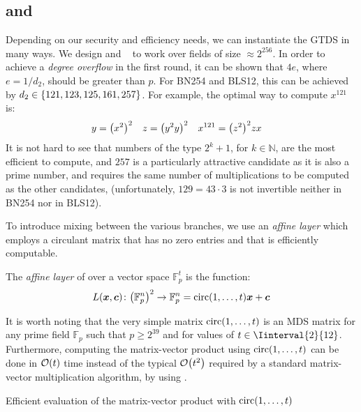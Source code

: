 \subsection{\Arion{} and \Arionhash{}}
Depending on our security and efficiency needs, we can instantiate the GTDS in many 
ways.
We design \Arion{} and \Arionhash{}~\textbf{\cite{RoyST2023}} to work over fields of size 
\(\approx 2^{256}\).
In order to achieve a \emph{degree overflow} in the first round, it can be shown that \(4e\), where 
\(e = {1}/{d_2}\), should be greater than \(p\). 
For BN254 and BLS12, this can be achieved by \(d_2 \in \left\{121, 123, 125, 161, 257\right\}\).
For example, the optimal way to compute \(x^{121}\) is:
\begin{align*}
  & y = \Parens*{x^{2}}^{2} && z = \Parens*{y^{2}y}^{2} && x^{121} = \Parens*{z^{2}}^{2}zx
\end{align*}
It is not hard to see that numbers of the type \(2^k + 1\), for \(k \in \mathbb{N}\), are the 
most efficient to compute, and \(257\) is a particularly attractive candidate as it is also a 
prime number, and requires the same number of multiplications to be computed as the other candidates, 
(unfortunately, \(129 = 43 \cdot 3\) is not invertible neither in BN254 nor in BLS12).

To introduce mixing between the various branches, we use an \emph{affine layer} which employs a 
circulant matrix that has no zero entries and that is efficiently computable.
\begin{definition}
  The \emph{affine layer} of \Arion{} over a vector space \(\mathbb{F}_p^t\) is the function:
  \[\call{L}{\bm{x}, \bm{c}}\colon \Parens*{\mathbb{F}_p^n}^2 \to \mathbb{F}_p^n = 
  \call{\circulant}{1, \dots, t}\bm{x} + \bm{c}\]
\end{definition}

It is worth noting that the very simple matrix \(\call{\circulant}{1, \dots, t}\) is an MDS matrix
for any prime field \(\mathbb{F}_p\) such that \(p \ge 2^{39}\) and for values of
\(t \in \Iinterval{2}{12}\).
Furthermore, computing the matrix-vector product using \(\call{\circulant}{1, \dots, t}\) can be 
done in \(\BigO{t}\) time instead of the typical \(\BigO{t^2}\) required by a standard matrix-vector 
multiplication algorithm, by using .
\begin{algorithm}
  \begin{algorithmic}
    \EndFor{}
    \EndFunction{}
  \end{algorithmic}
  \caption{Efficient evaluation of the matrix-vector product with 
    \(\call{\circulant}{1, \dots, t}\)}\label{alg:circ_mult}
\end{algorithm}

